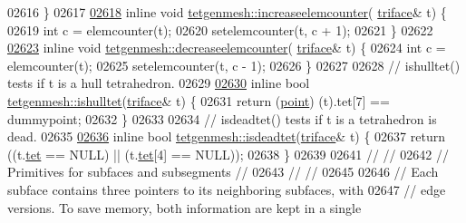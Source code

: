 \begin{DoxyCode}
02616 \}
02617 
\hypertarget{tetgen_8h_source.tex_l02618}{}\hyperlink{classtetgenmesh_a2b8bc02e55e18d93a649b9a06901d493}{02618} \textcolor{keyword}{inline} \textcolor{keywordtype}{void} \hyperlink{classtetgenmesh_a2b8bc02e55e18d93a649b9a06901d493}{tetgenmesh::increaseelemcounter}(
      \hyperlink{classtetgenmesh_1_1triface}{triface}& t) \{
02619   \textcolor{keywordtype}{int} c = elemcounter(t);
02620   setelemcounter(t, c + 1);
02621 \}
02622 
\hypertarget{tetgen_8h_source.tex_l02623}{}\hyperlink{classtetgenmesh_aa14427f959a82bb52f9a536f873676f6}{02623} \textcolor{keyword}{inline} \textcolor{keywordtype}{void} \hyperlink{classtetgenmesh_aa14427f959a82bb52f9a536f873676f6}{tetgenmesh::decreaseelemcounter}(
      \hyperlink{classtetgenmesh_1_1triface}{triface}& t) \{
02624   \textcolor{keywordtype}{int} c = elemcounter(t);
02625   setelemcounter(t, c - 1);
02626 \}
02627 
02628 \textcolor{comment}{// ishulltet()  tests if t is a hull tetrahedron.}
02629 
\hypertarget{tetgen_8h_source.tex_l02630}{}\hyperlink{classtetgenmesh_aa14f996a69b46afb1429ebf35a6e881c}{02630} \textcolor{keyword}{inline} \textcolor{keywordtype}{bool} \hyperlink{classtetgenmesh_aa14f996a69b46afb1429ebf35a6e881c}{tetgenmesh::ishulltet}(\hyperlink{classtetgenmesh_1_1triface}{triface}& t) \{
02631   \textcolor{keywordflow}{return} (\hyperlink{classtetgenmesh_ace3fb4f80389185b7c9b18ab69a3dea2}{point}) (t).tet[7] == dummypoint;
02632 \}
02633 
02634 \textcolor{comment}{// isdeadtet()  tests if t is a tetrahedron is dead.}
02635 
\hypertarget{tetgen_8h_source.tex_l02636}{}\hyperlink{classtetgenmesh_a155168de6a354f3b32c54dbc0710d55e}{02636} \textcolor{keyword}{inline} \textcolor{keywordtype}{bool} \hyperlink{classtetgenmesh_a155168de6a354f3b32c54dbc0710d55e}{tetgenmesh::isdeadtet}(\hyperlink{classtetgenmesh_1_1triface}{triface}& t) \{
02637   \textcolor{keywordflow}{return} ((t.\hyperlink{classtetgenmesh_1_1triface_ad3b174c4040b18a5286ddfeb8db02529}{tet} == NULL) || (t.\hyperlink{classtetgenmesh_1_1triface_ad3b174c4040b18a5286ddfeb8db02529}{tet}[4] == NULL));
02638 \}
02639 
02641 \textcolor{comment}{//                                                                           //}
02642 \textcolor{comment}{// Primitives for subfaces and subsegments                                   //}
02643 \textcolor{comment}{//                                                                           //}
02645 \textcolor{comment}{}
02646 \textcolor{comment}{// Each subface contains three pointers to its neighboring subfaces, with}
02647 \textcolor{comment}{//   edge versions.  To save memory, both information are kept in a single}

\end{DoxyCode}
